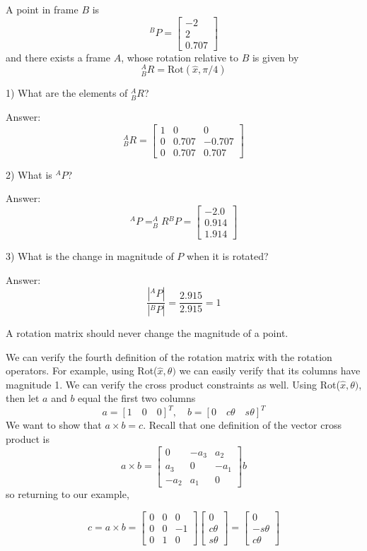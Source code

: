 \begin{ExampleSmall}
A point in frame $B$ is
\[
^BP = \left [ \begin{array}{c} -2 \\ 2 \\ 0.707 \end{array}\right]
\]
and there exists a frame $A$, whose rotation relative to $B$ is given by
\[
^A_BR = \mathrm{Rot} (\hat{x}, \pi/4 )
\]

1) What are the elements of $^A_BR$?

Answer:
\[
^A_BR = \left [ \begin{array}{ccc}
1  & 0 & 0  \\
0 & 0.707 & -0.707 \\
0 & 0.707 &  0.707 \end{array}\right]
\]

2) What is $^AP$?

Answer:
\[
^AP = ^A_BR{^BP} = \left[\begin{array}{c} -2.0 \\ 0.914 \\ 1.914 \end{array}\right]
\]

3) What is the change in magnitude of $P$ when it is rotated?

Answer:
\[
\frac{|^AP|}{|^BP|} = \frac{2.915}{2.915} = 1
\]


A rotation matrix should never change the magnitude of a point.
\end{ExampleSmall}



We can verify the fourth definition of the rotation matrix with the rotation operators. For example, using Rot($\hat{x}, \theta)$ we can easily verify that its columns have magnitude 1.   We can verify the cross product constraints as well. Using Rot($\hat{x}, \theta)$,  then let $a$ and $b$ equal the first two columns
\[
a = [1 \quad 0 \quad 0]^T, \quad b = [0 \quad c\theta \quad s\theta]^T
\]
We want to show that $a\times b=c$.
Recall that one definition of the vector cross product is
\[
a\times b = \left [
\begin{array}{ccc}
0 & -a_3 & a_2 \\
a_3 & 0 & -a_1 \\
-a_2 & a_1 & 0 \end{array} \right]
b
\]
so returning to our example,

\[
c = a \times b = \left [
\begin{array}{ccc}
0  & 0  & 0 \\
0  & 0 & -1 \\
0  & 1 & 0   \end{array} \right]
\left[ \begin{array}{c}
0 \\ c\theta \\ s\theta \end{array} \right]
=
\left[ \begin{array}{c}
0 \\ -s\theta \\ c\theta \end{array} \right]
\]

